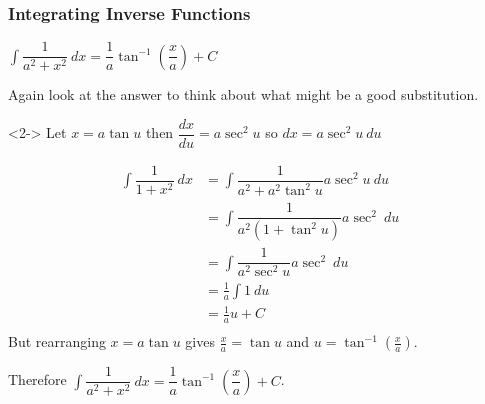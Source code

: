 \documentclass{beamer}
\begin{document}
	\begin{frame}[shrink=30]
		\frametitle{Integrating Inverse Functions}
		\begin{definition}
			$ \int \dfrac{1}{a^{2}+x^{2}}\ dx=\dfrac{1}{a}\tan ^{-1}\left( \dfrac{x}{a}\right) +C$
		\end{definition}
		\alert{Again look at the answer to think about what might be a good substitution.}
		
		\begin{solution}<2->
			Let $x=a\tan u$ then $\dfrac{dx}{du} = a \sec^{2} u$ so $dx = a \sec^{2} u \ du$
			
			\begin{align*}
			\int \dfrac{1}{1+x^{2}}\ dx &= \int \dfrac{1}{a^{2}+a^{2}\tan^{2}u}a \sec^{2}u \ du \\
			&= \int \dfrac{1}{a^{2}(1+\tan ^{2}u)}a \sec^{2} \ du \\
			&= \int \dfrac{1}{a^{2} \sec^{2} u}a \sec^{2}\ du\\
			&= \frac{1}{a}\int 1 \ du \\
			&= \frac{1}{a}u+C \\
			\end{align*}
			But rearranging $x=a\tan u$ gives $\frac{x}{a} = \tan u$ and $u = \tan ^{-1}(\frac{x}{a})$.
			
			Therefore $\int \dfrac{1}{a^{2}+x^{2}}\ dx=\dfrac{1}{a}\tan ^{-1}\left( \dfrac{x}{a}\right) +C$.
			
		\end{solution}
	\end{frame}
	
\end{document}
